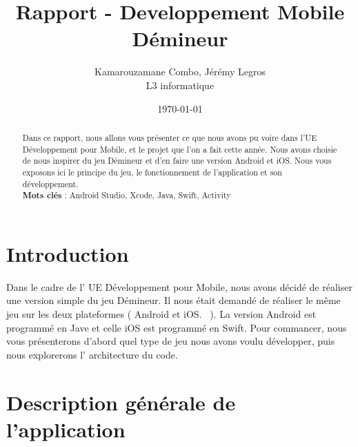 \documentclass{article}
\title{\textbf{ Rapport - Developpement Mobile \\ Démineur}}
\author{Kamarouzamane Combo, Jérémy Legros\\
		L3 informatique\\
	  }
\date{\today}
\begin{document}
\maketitle %


\begin{abstract}
	Dans ce rapport, nous allons vous présenter ce que nous avons pu voire dans l'UE Développement pour Mobile, et le projet que l'on a fait cette année.  Nous avons choisie de nous inspirer du jeu Démineur et d'en faire une version Android et iOS. Nous vous exposons ici le principe du jeu, le fonctionnement de l'application et son développement.\\

	\textbf{Mots clés }: Android Studio, Xcode, Java, Swift, Activity
\end{abstract}


\section{Introduction}
\label{section:intro} %
	Dans le cadre de l' UE Développement pour Mobile, nous avons décidé de réaliser une version simple du jeu Démineur.
Il nous était demandé de réaliser le même jeu sur les deux plateformes ( Android et iOS.~\cite{statOS} ). 
La version Android est programmé en Jave et celle iOS est programmé en Swift. Pour commancer, nous vous présenterons d'abord quel type de jeu nous avons voulu développer, puis nous explorerons l' architecture du code.


\section{Description générale de l'application}
\end{document}

